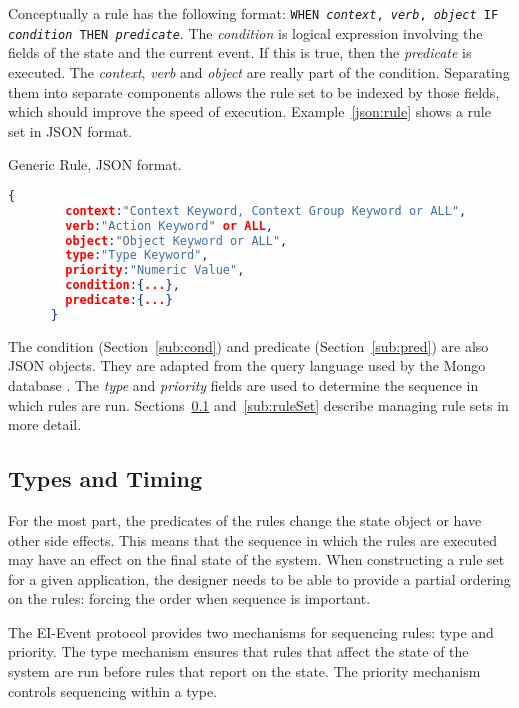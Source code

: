 \documentclass{article}
\begin{document}
  Conceptually a rule has the following format:  \texttt{WHEN
    \textit{context}, \textit{verb}, \textit{object} IF
    \textit{condition} THEN \textit{predicate}}.  The
  \textit{condition} is logical expression involving the fields of the
  state and the current event.  If this is true, then the
  \textit{predicate} is executed.  The \textit{context}, \textit{verb}
  and \textit{object} are really part of the condition.  Separating
  them into separate components allows the rule set to be indexed by
  those fields, which should improve the speed of execution.
  Example~\ref{json:rule} shows a rule set in JSON format.

  \begin{algorithm}
    \caption{Generic Rule, JSON format.}
    \label{json:Rule}
    \begin{lstlisting}[language=json]
      {
        context:"Context Keyword, Context Group Keyword or ALL",
        verb:"Action Keyword" or ALL,
        object:"Object Keyword or ALL",
        type:"Type Keyword",
        priority:"Numeric Value",
        condition:{...},
        predicate:{...}
      }
  \end{lstlisting}
  \end{algorithm}
  
  The condition (Section~\ref{sub:cond}) and predicate
  (Section~\ref{sub:pred}) are also JSON objects.  They are adapted
  from the query language used by the Mongo database \cite{mongo}.
  The \textit{type} and \textit{priority} fields are used to determine
  the sequence in which rules are run.  Sections~\ref{sub:types}
  and~\ref{sub:ruleSet} describe managing rule sets in more detail.

  \subsection{Types and Timing}
  \label{sub:types}

  For the most part, the predicates of the rules change the state
  object or have other side effects.  This means that the sequence in
  which the rules are executed may have an effect on the final state
  of the system.  When constructing a rule set for a given
  application, the designer needs to be able to provide a partial
  ordering on the rules:  forcing the order when sequence is
  important.

  The EI-Event protocol provides two mechanisms for sequencing rules:
  type and priority.  The type mechanism ensures that rules that
  affect the state of the system are run before rules that report on
  the state.  The priority mechanism controls sequencing within a
  type.
\end{document}
